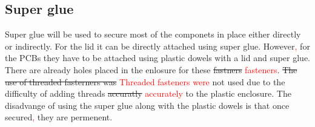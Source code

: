 \documentclass[12pt, titlepage]{article}
\begin{document}
\subsection{Super glue}
Super glue will be used to secure most of the componets in place either directly or indirectly. For the lid it can be directly attached using super glue. However\textcolor{red}{,} for the PCBs they have to be attached using plastic dowels with a lid and super glue. There are already holes placed in the enlosure for these \sout{fastners} \textcolor{red}{fasteners}. \sout{The use of threaded fasterners was} \textcolor{red}{Threaded fasteners were} not used due to the difficulty of adding threads \sout{accuratly} \textcolor{red}{accurately} to the plastic enclosure. The disadvange of using the super glue along with the plastic dowels is that once secured\textcolor{red}{,} they are permenent.   
\end{document}
